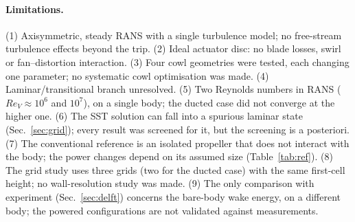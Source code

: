 \documentclass[11pt,a4paper]{article}
\newcommand{\ReV}{\mathit{Re}_V}
\begin{document}
\paragraph{Limitations.}
(1) Axisymmetric, steady RANS with a single turbulence model; no free-stream turbulence
effects beyond the trip. (2) Ideal actuator disc: no blade losses, swirl or
fan--distortion interaction. (3) Four cowl geometries were tested, each changing one parameter;
no systematic cowl optimisation was made. (4) Laminar/transitional branch
unresolved. (5) Two Reynolds numbers in RANS ($\ReV\approx10^6$ and $10^7$), on a single body; the
ducted case did not converge at the higher one. (6) The SST solution can fall into a
spurious laminar state (Sec.~\ref{sec:grid}); every result was screened for it, but the screening is
a posteriori. (7) The conventional reference is an isolated propeller that does not interact
with the body; the power changes depend on its assumed size (Table~\ref{tab:ref}).
(8) The grid study uses three grids (two for the ducted case) with the same first-cell
height; no wall-resolution study was made. (9) The only comparison with experiment
(Sec.~\ref{sec:delft}) concerns the bare-body wake energy, on a different body; the
powered configurations are not validated against measurements.
\end{document}
